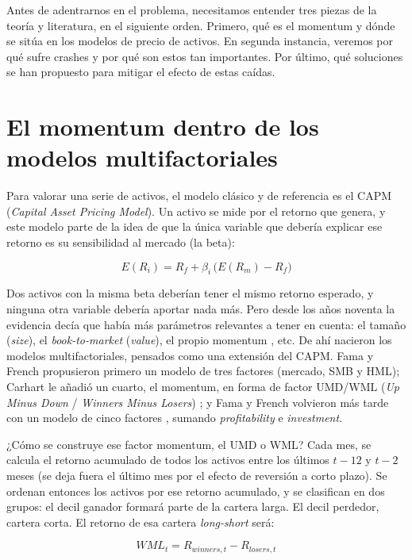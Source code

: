 \documentclass[12pt]{report} %
\begin{document}
Antes de adentrarnos en el problema, necesitamos entender tres piezas de la teoría y literatura, en el siguiente orden. Primero, qué es el momentum y dónde se sitúa en los modelos de precio de activos. En segunda instancia, veremos por qué sufre crashes y por qué son estos tan importantes. Por último, qué soluciones se han propuesto para mitigar el efecto de estas caídas.

\section{El momentum dentro de los modelos multifactoriales}

Para valorar una serie de activos, el modelo clásico y de referencia es el CAPM (\textit{Capital Asset Pricing Model}). Un activo se mide por el retorno que genera, y este modelo parte de la idea de que la única variable que debería explicar ese retorno es su sensibilidad al mercado (la beta):

\begin{equation}
	E(R_i) = R_f + \beta_i \, \big( E(R_m) - R_f \big)
\end{equation}

Dos activos con la misma beta deberían tener el mismo retorno esperado, y ninguna otra variable debería aportar nada más. Pero desde los años noventa la evidencia decía que había más parámetros relevantes a tener en cuenta: el tamaño (\textit{size}), el \textit{book-to-market} (\textit{value}), el propio momentum \citep{jegadeeshtitman1993}, etc. De ahí nacieron los modelos multifactoriales, pensados como una extensión del CAPM. Fama y French propusieron primero un modelo de tres factores \citep{famafrench1993} (mercado, SMB y HML); Carhart le añadió un cuarto, el momentum, en forma de factor UMD/WML (\textit{Up Minus Down} / \textit{Winners Minus Losers}) \citep{carhart1997}; y Fama y French volvieron más tarde con un modelo de cinco factores \citep{famafrench2015}, sumando \textit{profitability} e \textit{investment}.

¿Cómo se construye ese factor momentum, el UMD o WML? Cada mes, se calcula el retorno acumulado de todos los activos entre los últimos $t-12$ y $t-2$ meses (se deja fuera el último mes por el efecto de reversión a corto plazo). Se ordenan entonces los activos por ese retorno acumulado, y se clasifican en dos grupos: el decil ganador formará parte de la cartera larga. El decil perdedor, cartera corta. El retorno de esa cartera \textit{long-short} será:

\begin{equation}
	WML_t = R_{winners,t} - R_{losers,t}
\end{equation}
\end{document}
